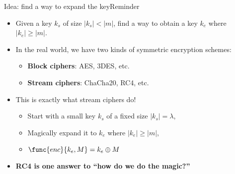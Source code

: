 \ifdefined\PRESENTATION\else\PassOptionsToClass{handout}{beamer}\fi\documentclass[aspectratio=169, lualatex]{beamer}
\begin{document}
\begin{frame}{Idea: find a way to expand the key}{Reminder}
	\begin{itemize}
		\item Given a key $k_s$ of size $\left|k_s\right| < \left|m\right|$, find a way to obtain a key $k_e$ where $\left|k_e\right| \geq \left|m\right|$.
		\item In the real world, we have two kinds of symmetric encryption schemes:
		      \begin{itemize}
			      \item \textbf{Block ciphers}: AES, 3DES, etc.
			      \item \textbf{Stream ciphers}: ChaCha20, RC4, etc.
		      \end{itemize}
		\item This is exactly what stream ciphers do!
		      \begin{itemize}
			      \item Start with a small key $k_s$ of a fixed size $\left|k_s\right| = \lambda$,
			      \item Magically expand it to $k_e$ where $\left|k_e\right| \geq \left|m\right|$,
			      \item $\func{enc}{k_e, M} = k_e \oplus M$
		      \end{itemize}
		\item \textbf{RC4 is one answer to ``how do we do the magic?''}
	\end{itemize}
\end{frame}
\end{document}
